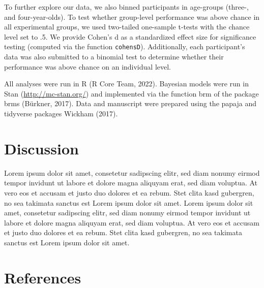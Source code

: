 \documentclass[
  man]{apa6}
\begin{document}
To further explore our data, we also binned participants in age-groups (three-, and four-year-olds). To test whether group-level performance was above chance in all experimental groups, we used two-tailed one-sample t-tests with the chance level set to .5. We provide Cohen's d as a standardized effect size for significance testing (computed via the function \texttt{cohensD}). Additionally, each participant's data was also submitted to a binomial test to determine whether their performance was above chance on an individual level.

All analyses were run in R (R Core Team, 2022). Bayesian models were run in Stan (\url{http://mc-stan.org/}) and implemented via the function brm of the package brms (Bürkner, 2017). Data and manuscript were prepared using the papaja and tidyverse packages Wickham (2017).

\section{Discussion}\label{discussion}

Lorem ipsum dolor sit amet, consetetur sadipscing elitr, sed diam nonumy eirmod tempor invidunt ut labore et dolore magna aliquyam erat, sed diam voluptua. At vero eos et accusam et justo duo dolores et ea rebum. Stet clita kasd gubergren, no sea takimata sanctus est Lorem ipsum dolor sit amet. Lorem ipsum dolor sit amet, consetetur sadipscing elitr, sed diam nonumy eirmod tempor invidunt ut labore et dolore magna aliquyam erat, sed diam voluptua. At vero eos et accusam et justo duo dolores et ea rebum. Stet clita kasd gubergren, no sea takimata sanctus est Lorem ipsum dolor sit amet.

\newpage

\section{References}\label{references}

\begingroup
\setlength{\parindent}{-0.5in}
\setlength{\leftskip}{0.5in}
\end{document}
